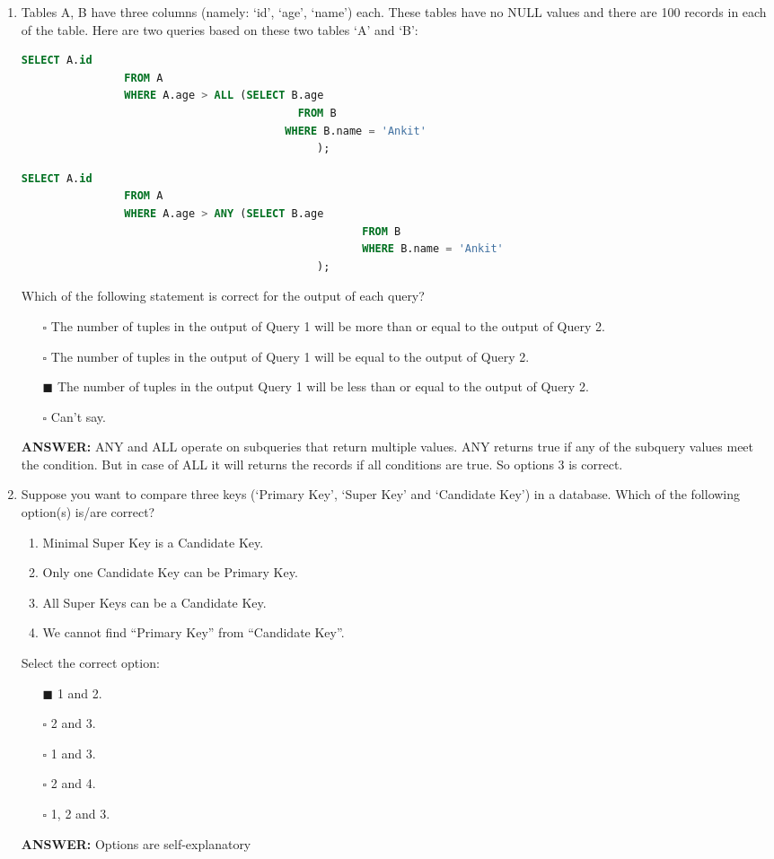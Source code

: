 \documentclass[10pt]{article}
\begin{document}
\begin{enumerate}
		\item Tables A, B have three columns (namely: ‘id’, ‘age’, ‘name’) each. These tables have no NULL values and there are 100 records in each of the table. Here are two queries based on these two tables ‘A’ and ‘B’:
			\begin{lstlisting}[language=SQL,firstline=1, lastline=6] 
				SELECT A.id 
				FROM A 
				WHERE A.age > ALL (SELECT B.age 
						             	   FROM B
						                 WHERE B.name = 'Ankit'
								              );
			\end{lstlisting}
			\begin{lstlisting}[language=SQL,firstline=1, lastline=6] 
				SELECT A.id 
				FROM A 
				WHERE A.age > ANY (SELECT B.age 
										             FROM B 
										             WHERE B.name = 'Ankit'
								              );
			\end{lstlisting}
			Which of the following statement is correct for the output of each query?
			\begin{enumerate}
				\item[$\square$] The number of tuples in the output of Query 1 will be more than or equal to the output of Query 2.
				\item[$\square$] The number of tuples in the output of Query 1 will be equal to the output of Query 2.
				\item[$\blacksquare$] The number of tuples in the output Query 1 will be less than or equal to the output of Query 2.
				\item[$\square$] Can’t say.
			\end{enumerate}
			\color{red} \textbf{ANSWER:} \color{black} ANY and ALL operate on subqueries that return multiple values. ANY returns true if any of the subquery values meet the condition. But in case of ALL it will returns the records if all conditions are true. So options 3 is correct.

		\item Suppose you want to compare three keys (‘Primary Key’, ‘Super Key’ and ‘Candidate Key’) in a database. Which of the following option(s) is/are correct?
			\begin{enumerate}
				\item Minimal Super Key is a Candidate Key.
				\item Only one Candidate Key can be Primary Key.
				\item All Super Keys can be a Candidate Key.
				\item We cannot find “Primary Key” from “Candidate Key”.
			\end{enumerate}
			Select the correct option:
			\begin{enumerate}
				\item[$\blacksquare$] 1 and 2.
				\item[$\square$] 2 and 3.
				\item[$\square$] 1 and 3.
				\item[$\square$] 2 and 4.
				\item[$\square$] 1, 2 and 3.
			\end{enumerate}
			\color{red} \textbf{ANSWER:} \color{black} Options are self-explanatory
		

\end{enumerate}
\end{document}
